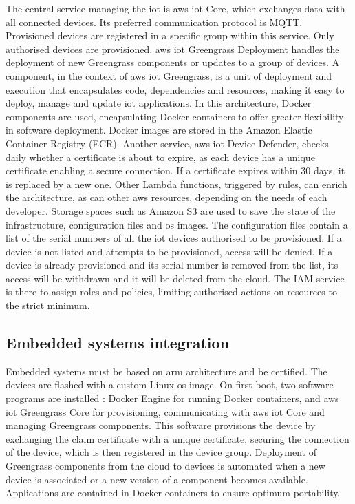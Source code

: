 The central service managing the \acrshort{iot} is \gls{aws} \acrshort{iot} Core, which exchanges data with all connected devices. Its preferred communication protocol is MQTT. Provisioned devices are registered in a specific group within this service. Only authorised devices are provisioned. \gls{aws} \acrshort{iot} Greengrass Deployment handles the deployment of new Greengrass components or updates to a group of devices. A component, in the context of \gls{aws} \acrshort{iot} Greengrass, is a unit of deployment and execution that encapsulates code, dependencies and resources, making it easy to deploy, manage and update \acrshort{iot} applications. In this architecture, Docker components are used, encapsulating Docker containers to offer greater flexibility in software deployment. Docker images are stored in the Amazon Elastic Container Registry (ECR). Another service, \gls{aws} \acrshort{iot} Device Defender, checks daily whether a certificate is about to expire, as each device has a unique certificate enabling a secure connection. If a certificate expires within 30 days, it is replaced by a new one. Other Lambda functions, triggered by rules, can enrich the architecture, as can other \gls{aws} resources, depending on the needs of each developer. Storage spaces such as Amazon S3 are used to save the state of the infrastructure, configuration files and \acrshort{os} images. The configuration files contain a list of the serial numbers of all the \acrshort{iot} devices authorised to be provisioned. If a device is not listed and attempts to be provisioned, access will be denied. If a device is already provisioned and its serial number is removed from the list, its access will be withdrawn and it will be deleted from the \gls{cloud}. The IAM service is there to assign roles and policies, limiting authorised actions on resources to the strict minimum.

\subsection{Embedded systems integration}
Embedded systems must be based on \gls{arm} architecture and be  certified. The devices are flashed with a custom Linux \acrshort{os} image. On first boot, two software programs are installed : Docker Engine for running Docker containers, and \gls{aws} \acrshort{iot} Greengrass Core for \gls{provisioning}, communicating with \gls{aws} \acrshort{iot} Core and managing Greengrass components. This software provisions the device by exchanging the claim certificate with a unique certificate, securing the connection of the device, which is then registered in the device group. Deployment of Greengrass components from the \gls{cloud} to devices is automated when a new device is associated or a new version of a component becomes available. Applications are contained in Docker containers to ensure optimum portability.


